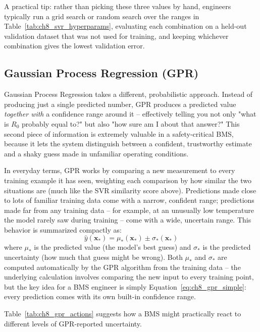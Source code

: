 A practical tip: rather than picking these three values by hand, engineers typically run a grid search or random search over the ranges in Table~\ref{tab:ch8_svr_hyperparams}, evaluating each combination on a held-out validation dataset that was not used for training, and keeping whichever combination gives the lowest validation error.

\subsection{Gaussian Process Regression (GPR)}
\label{subsec:gpr_details}

Gaussian Process Regression takes a different, probabilistic approach. Instead of producing just a single predicted number, GPR produces a predicted value \emph{together with} a confidence range around it -- effectively telling you not only "what is $R_0$ probably equal to?" but also "how sure am I about that answer?" This second piece of information is extremely valuable in a safety-critical BMS, because it lets the system distinguish between a confident, trustworthy estimate and a shaky guess made in unfamiliar operating conditions.

In everyday terms, GPR works by comparing a new measurement to every training example it has seen, weighting each comparison by how similar the two situations are (much like the SVR similarity score above). Predictions made close to lots of familiar training data come with a narrow, confident range; predictions made far from any training data -- for example, at an unusually low temperature the model rarely saw during training -- come with a wide, uncertain range. This behavior is summarized compactly as:
\begin{equation}
\hat{y}(\mathbf{x}_*) = \mu_*(\mathbf{x}_*) \pm \sigma_*(\mathbf{x}_*)
\label{eq:ch8_gpr_simple}
\end{equation}
where $\mu_*$ is the predicted value (the model's best guess) and $\sigma_*$ is the predicted uncertainty (how much that guess might be wrong). Both $\mu_*$ and $\sigma_*$ are computed automatically by the GPR algorithm from the training data -- the underlying calculation involves comparing the new input to every training point, but the key idea for a BMS engineer is simply Equation~\eqref{eq:ch8_gpr_simple}: every prediction comes with its own built-in confidence range.

Table~\ref{tab:ch8_gpr_actions} suggests how a BMS might practically react to different levels of GPR-reported uncertainty.

